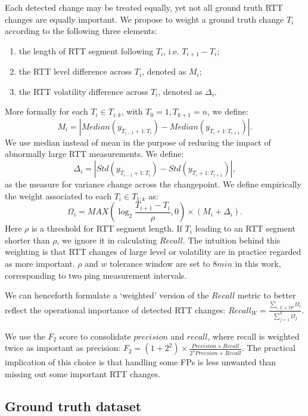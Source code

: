 Each detected change may be treated equally, yet not all ground truth RTT changes are equally important. 
We propose to weight a ground truth change $T_i$ according to the following three elements:
\begin{enumerate}
\item the length of RTT segment following $T_i$, i.e. $T_{i+1} - T_i$;
\item the RTT level difference across $T_i$, denoted as $M_i$; 
\item the RTT volatility difference across $T_i$, denoted as $\Delta_i$.
\end{enumerate}
More formally for each $T_i \in T_{i:k}$, with $T_0=1, T_{k+1} = n$, we define:
\begin{equation*}
M_i = |Median(y_{T_{i-1}+1:T_i}) - Median(y_{T_i+1:T_{i+1}})|.
\end{equation*}
We use median instead of mean in the purpose of reducing the impact of abnormally large RTT measurements.
We define:
\begin{equation*}
\Delta_i = |Std(y_{T_{i-1}+1:T_i}) - Std(y_{T_i+1:T_{i+1}})|,
\end{equation*}
as the measure for variance change across the changepoint.
We define empirically the weight associated to each $T_i \in T_{1:k}$ as:
\begin{equation*}
\Omega_i = MAX(\log_2\frac{T_{i+1} - T_i}{\rho}, 0) \times (M_i + \Delta_i).
\end{equation*}
Here $\rho$ is a threshold for RTT segment length. 
If $T_i$ leading to an RTT segment shorter than $\rho$, we ignore it in calculating $Recall$.
The intuition behind this weighting is that RTT changes of large level or volatility are in practice regarded as more important. $\rho$ and $w$ tolerance window are set to $8min$ in this work, corresponding to two ping measurement intervals. 

We can henceforth formulate a `weighted' version of the $Recall$ metric to better reflect the operational importance of detected RTT changes: $Recall_W = \frac{\sum_{i, T_i \in TP} \Omega_i}{\sum_{j=1}^k \Omega_j}.$

We use the $F_2$ score to consolidate $precision$ and $recall$, where recall is weighted twice as important as precision: $F_2 = (1+2^2) \times \frac{Precision \times Recall}{2^2Precsion + Recall}.$
The practical implication of this choice is that handling some FPs is less unwanted than missing out some important RTT changes.

\subsection{Ground truth dataset}
\label{sec:label}

